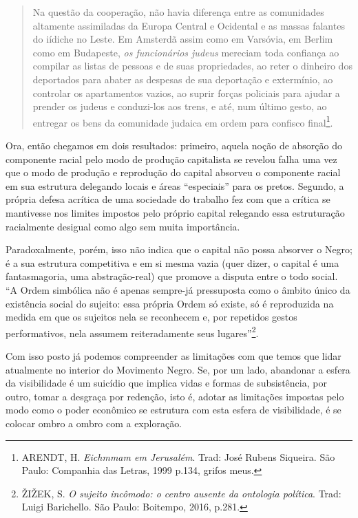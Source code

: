 \begin{quote}
Na questão da cooperação, não havia diferença entre as comunidades
altamente assimiladas da Europa Central e Ocidental e as massas falantes
do iídiche no Leste. Em Amsterdã assim como em Varsóvia, em Berlim como
em Budapeste, \emph{os funcionários judeus} mereciam toda confiança ao
compilar as listas de pessoas e de suas propriedades, ao reter o
dinheiro dos deportados para abater as despesas de sua deportação e
extermínio, ao controlar os apartamentos vazios, ao suprir forças
policiais para ajudar a prender os judeus e conduzi-los aos trens, e
até, num último gesto, ao entregar os bens da comunidade judaica em
ordem para confisco final\footnote{ARENDT, H. \emph{Eichmmam em
  Jerusalém}. Trad: José Rubens Siqueira. São Paulo: Companhia das
  Letras, 1999 p.134, grifos meus.}.
\end{quote}

Ora, então chegamos em dois resultados: primeiro, aquela noção de
absorção do componente racial pelo modo de produção capitalista se
revelou falha uma vez que o modo de produção e reprodução do capital
absorveu o componente racial em sua estrutura delegando locais e áreas
``especiais'' para os pretos. Segundo, a própria defesa acrítica de uma
sociedade do trabalho fez com que a crítica se mantivesse nos limites
impostos pelo próprio capital relegando essa estruturação racialmente
desigual como algo sem muita importância.

Paradoxalmente, porém, isso não indica que o capital não possa absorver
o Negro; é a sua estrutura competitiva e em si mesma vazia (quer dizer,
o capital é uma fantasmagoria, uma abstração-real) que promove a disputa
entre o todo social. ``A Ordem simbólica não é apenas sempre-já
pressuposta como o âmbito único da existência social do sujeito: essa
própria Ordem só existe, só é reproduzida na medida em que os sujeitos
nela se reconhecem e, por repetidos gestos performativos, nela assumem
reiteradamente seus lugares''\footnote{ŽIŽEK, S. \emph{O sujeito
  incômodo: o centro ausente da ontologia política}. Trad: Luigi
  Barichello. São Paulo: Boitempo, 2016, p.281.}.

Com isso posto já podemos compreender as limitações com que temos que
lidar atualmente no interior do Movimento Negro. Se, por um lado,
abandonar a esfera da visibilidade é um suicídio que implica vidas e
formas de subsistência, por outro, tomar a desgraça por redenção, isto
é, adotar as limitações impostas pelo modo como o poder econômico se
estrutura com esta esfera de visibilidade, é se colocar ombro a ombro
com a exploração.

